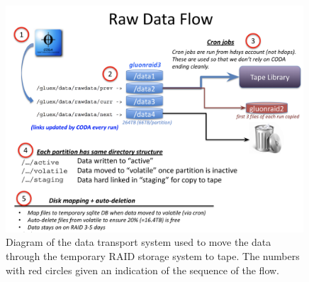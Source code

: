 \begin{figure}[tbp]
\begin{center}
\includegraphics[width=0.99\textwidth]{figures/online_dataflow.png}
\caption{\label{fig:online_dataflow}Diagram of the data transport system used to move the data through the temporary RAID storage system to tape. The numbers with red circles given an indication of the sequence of the flow. }   
\end{center}  
\end{figure}
